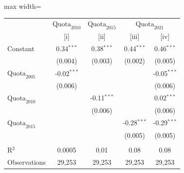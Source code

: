 
\begingroup
\centering
\scriptsize
\begin{adjustbox}{max width=\linewidth}
   \begin{threeparttable}[b]
      \begin{tabular}{lcccc}
         \toprule
          & \textit{$\text{Quota}_{2010}$} & \textit{$\text{Quota}_{2015}$} & \multicolumn{2}{c}{\textit{$\text{Quota}_{2021}$}}\\
                                & [i]           & [ii]          & [iii]         & [iv]\\  
         \midrule 
         Constant               & 0.34$^{***}$  & 0.38$^{***}$  & 0.44$^{***}$  & 0.46$^{***}$\\   
                                & (0.004)       & (0.003)       & (0.002)       & (0.005)\\   
         $\text{Quota}_{2005}$  & -0.02$^{***}$ &               &               & -0.05$^{***}$\\   
                                & (0.006)       &               &               & (0.006)\\   
         $\text{Quota}_{2010}$  &               & -0.11$^{***}$ &               & 0.02$^{***}$\\   
                                &               & (0.006)       &               & (0.006)\\   
         $\text{Quota}_{2015}$  &               &               & -0.28$^{***}$ & -0.29$^{***}$\\   
                                &               &               & (0.005)       & (0.005)\\   
          \\
         R$^2$                  & 0.0005        & 0.01          & 0.08          & 0.08\\  
         Observations           & 29,253        & 29,253        & 29,253        & 29,253\\  
         \bottomrule
      \end{tabular}
   \end{threeparttable}
\end{adjustbox}
\par\endgroup


